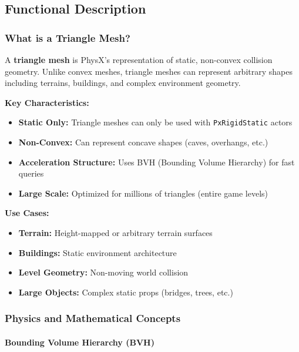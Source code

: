 
\subsection{Functional Description}

\subsubsection{What is a Triangle Mesh?}

A \textbf{triangle mesh} is PhysX's representation of static, non-convex collision geometry. Unlike convex meshes, triangle meshes can represent arbitrary shapes including terrains, buildings, and complex environment geometry.

\textbf{Key Characteristics:}
\begin{itemize}
    \item \textbf{Static Only:} Triangle meshes can only be used with \texttt{PxRigidStatic} actors
    \item \textbf{Non-Convex:} Can represent concave shapes (caves, overhangs, etc.)
    \item \textbf{Acceleration Structure:} Uses BVH (Bounding Volume Hierarchy) for fast queries
    \item \textbf{Large Scale:} Optimized for millions of triangles (entire game levels)
\end{itemize}

\textbf{Use Cases:}
\begin{itemize}
    \item \textbf{Terrain:} Height-mapped or arbitrary terrain surfaces
    \item \textbf{Buildings:} Static environment architecture
    \item \textbf{Level Geometry:} Non-moving world collision
    \item \textbf{Large Objects:} Complex static props (bridges, trees, etc.)
\end{itemize}

\subsubsection{Physics and Mathematical Concepts}

\paragraph{Bounding Volume Hierarchy (BVH)}


